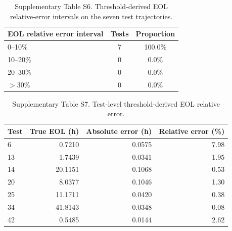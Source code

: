 \documentclass[preprint,12pt]{elsarticle}
\begin{document}
\begin{table}[htbp]
\centering
\footnotesize
\caption{Supplementary Table S6. Threshold-derived EOL relative-error intervals on the seven test trajectories.}
\begin{tabular}{@{}lcc@{}}
\toprule
EOL relative error interval & Tests & Proportion \\
\midrule
0--10\% & 7 & 100.0\% \\
10--20\% & 0 & 0.0\% \\
20--30\% & 0 & 0.0\% \\
$>$30\% & 0 & 0.0\% \\
\bottomrule
\end{tabular}
\end{table}

\begin{table}[htbp]
\centering
\footnotesize
\caption{Supplementary Table S7. Test-level threshold-derived EOL relative error.}
\begin{tabular}{@{}lrrr@{}}
\toprule
Test & True EOL (h) & Absolute error (h) & Relative error (\%) \\
\midrule
6 & 0.7210 & 0.0575 & 7.98 \\
13 & 1.7439 & 0.0341 & 1.95 \\
14 & 20.1151 & 0.1068 & 0.53 \\
20 & 8.0377 & 0.1046 & 1.30 \\
25 & 11.1711 & 0.0420 & 0.38 \\
34 & 41.8143 & 0.0348 & 0.08 \\
42 & 0.5485 & 0.0144 & 2.62 \\
\bottomrule
\end{tabular}
\end{table}
\end{document}
